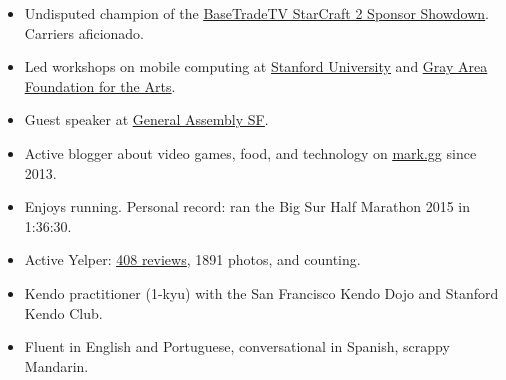 

\begin{cvparagraph}


\begin{justify}
\begin{itemize}[leftmargin=2ex, nosep]
    \setlength{\parskip}{0pt}
    \setlength\itemsep{0.15em}
    \renewcommand{\labelitemi}{\bullet}
    
    \item Undisputed champion of the \href{http://www.teamliquid.net/forum/sc2-tournaments/529105-basetradetv-sponsor-showdown}{\underline {BaseTradeTV StarCraft 2 Sponsor Showdown}}. Carriers aficionado.
    \item Led workshops on mobile computing at \href{https://ccrma.stanford.edu/workshops/music-and-mobile-computing}{\underline{Stanford University}} and \href{http://main.dev.gaffta.org/?author=81}{\underline{Gray Area Foundation for the Arts}}.
    \item Guest speaker at \href{https://generalassemb.ly/instructors/mark-cerqueira/10476}{\underline{General Assembly SF}}.
	\item Active blogger about video games, food, and technology on \href{mark.gg}{\underline{mark.gg}} since 2013.
	\item Enjoys running. Personal record: ran the Big Sur Half Marathon 2015 in 1:36:30.
	\item Active Yelper: \href{markcerqueira.yelp.com}{\underline{408 reviews}}, 1891 photos, and counting.
	\item Kendo practitioner (1-kyu) with the San Francisco Kendo Dojo and Stanford Kendo Club.
	\item Fluent in English and Portuguese, conversational in Spanish, scrappy Mandarin.
	

\end{itemize}
\end{justify}

\end{cvparagraph}
